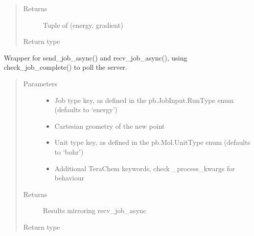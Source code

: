 \documentclass[letterpaper,10pt,english]{sphinxmanual}
\begin{document}
\begin{fulllineitems}
\begin{fulllineitems}
\begin{quote}
\begin{description}
\item[{Returns}] \leavevmode
Tuple of (energy, gradient)

\item[{Return type}] \leavevmode
{}

\end{description}\end{quote}

\end{fulllineitems}


\begin{fulllineitems}
\label{\detokenize{tcpb:tcpb.tcpb.TCProtobufClient.compute_job_sync}}
Wrapper for send\_job\_async() and recv\_job\_async(), using check\_job\_complete() to poll the server.
\begin{quote}\begin{description}
\item[{Parameters}] \leavevmode\begin{itemize}
\item {} 
 \textendash{} Job type key, as defined in the pb.JobInput.RunType enum (defaults to ‘energy’)

\item {} 
 \textendash{} Cartesian geometry of the new point

\item {} 
 \textendash{} Unit type key, as defined in the pb.Mol.UnitType enum (defaults to ‘bohr’)

\item {} 
 \textendash{} Additional TeraChem keywords, check \_process\_kwargs for behaviour

\end{itemize}

\item[{Returns}] \leavevmode
Results mirroring recv\_job\_async

\item[{Return type}] \leavevmode
{}


\end{description}
\end{quote}
\end{fulllineitems}
\end{fulllineitems}
\end{document}
